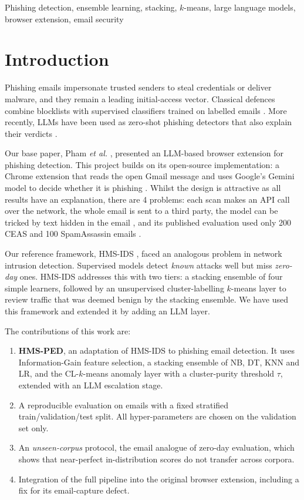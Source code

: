 \documentclass[conference]{IEEEtran}
\begin{document}
\begin{IEEEkeywords}
Phishing detection, ensemble learning, stacking, $k$-means, large language models, browser extension, email security
\end{IEEEkeywords}

\section{Introduction}
Phishing emails impersonate trusted senders to steal credentials or deliver malware, and they remain a leading initial-access vector. Classical defences combine blocklists with supervised classifiers trained on labelled emails \cite{fette2007learning,abunimeh2007comparison}. More recently, LLMs have been used as zero-shot phishing detectors that also explain their verdicts \cite{koide2024chatspamdetector,heiding2024devising}.

Our base paper, Pham \emph{et al.} \cite{pham2025demo}, presented an LLM-based browser extension for phishing detection. This project builds on its open-source implementation: a Chrome extension that reads the open Gmail message and uses Google's Gemini model to decide whether it is phishing \cite{cmpe209repo}. Whilst the design is attractive as all results have an explanation, there are 4 problems: each scan makes an API call over the network, the whole email is sent to a third party, the model can be tricked by text hidden in the email \cite{greshake2023indirect}, and its published evaluation used only 200 CEAS and 100 SpamAssassin emails \cite{pham2025demo}.

Our reference framework, HMS-IDS \cite{saurabh2025hmsids}, faced an analogous problem in network intrusion detection. Supervised models detect \emph{known} attacks well but miss \emph{zero-day} ones. HMS-IDS addresses this with two tiers: a stacking ensemble of four simple learners, followed by an unsupervised cluster-labelling $k$-means layer to review traffic that was deemed benign by the stacking ensemble. We have used this framework and extended it by adding an LLM layer. 

The contributions of this work are:
\begin{enumerate}
\item \textbf{HMS-PED}, an adaptation of HMS-IDS to phishing email detection. It uses Information-Gain feature selection, a stacking ensemble of NB, DT, KNN and LR, and the CL-$k$-means anomaly layer with a cluster-purity threshold $\tau$, extended with an LLM escalation stage.
\item A reproducible evaluation on \NTotal{} emails with a fixed stratified train/validation/test split. All hyper-parameters are chosen on the validation set only.
\item An \emph{unseen-corpus} protocol, the email analogue of zero-day evaluation, which shows that near-perfect in-distribution scores do not transfer across corpora.
\item Integration of the full pipeline into the original browser extension, including a fix for its email-capture defect.
\end{enumerate}
\end{document}
